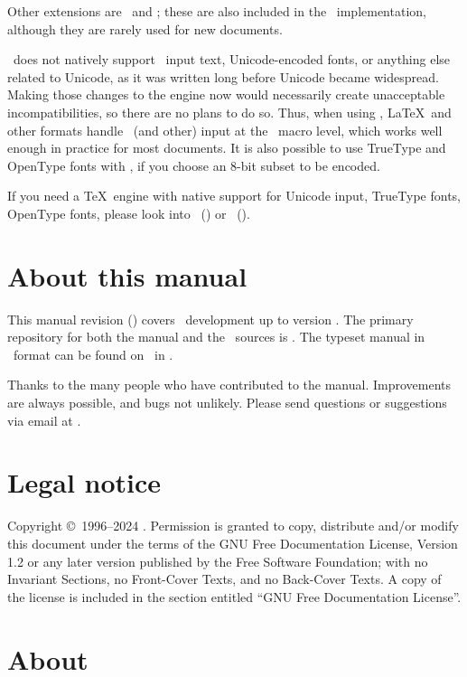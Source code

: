 \documentclass{pdftexmanual}
\begin{document}
Other extensions are \MLTEX\ and \ENCTEX; these are also included in the
\PDFTEX\ implementation, although they are rarely used for new documents.

\PDFTEX\ does not natively support \UTFEIGHT\ input text,
Unicode-encoded fonts, or anything else related to Unicode, as it was
written long before Unicode became widespread. Making those changes to
the engine now would necessarily create unacceptable incompatibilities,
so there are no plans to do so. Thus, when using \PDFTEX, \LaTeX\ and
other formats handle \UTFEIGHT\ (and other) input at the \TEX\ macro
level, which works well enough in practice for most documents. It is
also possible to use TrueType and OpenType fonts with \PDFTEX, if you
choose an 8-bit subset to be encoded.

If you need a \TeX\ engine with native support for Unicode input,
TrueType fonts, OpenType fonts, please look into \LUATEX\
() or \XETEX\ ().

\section{About this manual}

This manual revision (\rcsrevision) covers \PDFTEX\ development up to
version \currentpdftex. The primary repository for both the manual and
the \PDFTEX\ sources is \useurl{ptexdevel}. The typeset manual in \PDF\
format can be found on \CTAN\ in .

Thanks to the many people who have contributed to the manual.
Improvements are always possible, and bugs not unlikely.
Please send questions or suggestions via email at .

\section{Legal notice}

Copyright \copyright\ 1996--2024 \THANH.
Permission is granted to copy, distribute and/or modify this document
under the terms of the GNU Free Documentation License, Version 1.2
or any later version published by the Free Software Foundation;
with no Invariant Sections, no Front-Cover Texts, and no Back-Cover Texts.
A copy of the license is included in the section entitled ``GNU
Free Documentation License''.

\section{About \PDF}
\end{document}
